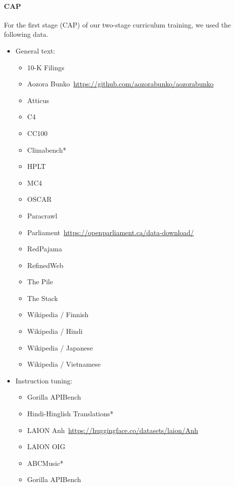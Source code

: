 \paragraph{CAP}
For the first stage (CAP) of our two-stage curriculum training, we used the following data.
\begin{itemize}
\item General text:
    \begin{itemize}
    \item 10-K Filings
    \item Aozora Bunko~{\tiny\url{https://github.com/aozorabunko/aozorabunko}}    
    \item Atticus~\citep{hendrycks2021cuad}
    \item C4~\citep{2019t5}
    \item CC100~\cite{conneau2020unsupervised}
    \item Climabench*
    \item HPLT\citep{degibert2024new}
    \item MC4~\citep{2019t5}
    \item OSCAR~\citep{async_pipelines}
    \item Paracrawl~\citep{ghussin2023exploring}
    \item Parliament~{\tiny\url{https://openparliament.ca/data-download/}}
    \item RedPajama~\citep{together2023redpajama}
    \item RefinedWeb~\citep{refinedweb}
    \item The Pile~\citep{gao2020pile}
    \item The Stack~\citep{kocetkov2022stack}
    \item Wikipedia / Finnish
    \item Wikipedia / Hindi
    \item Wikipedia / Japanese
    \item Wikipedia / Vietnamese
    \end{itemize}
\item Instruction tuning:
    \begin{itemize}
    \item Gorilla APIBench~\citep{patil2023gorilla}
    \item Hindi-Hinglish Translations*
    \item LAION Anh~{\tiny\url{https://huggingface.co/datasets/laion/Anh}}
    \item LAION OIG~\citep{oig2023}
    \item ABCMusic*
    \item Gorilla APIBench

\end{itemize}
\end{itemize}
